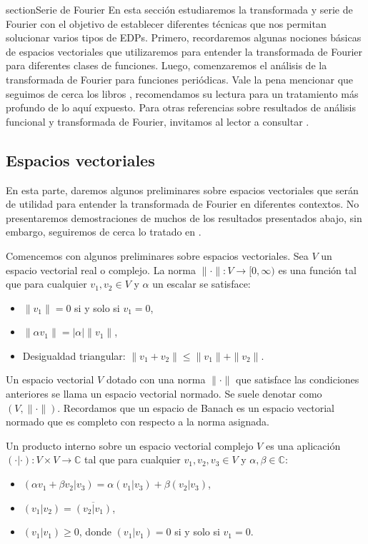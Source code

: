 

section{Serie de Fourier}
En esta sección estudiaremos la transformada y serie de Fourier con el objetivo de establecer diferentes técnicas que nos permitan solucionar varios tipos de EDPs. Primero, recordaremos algunas nociones básicas de espacios vectoriales que utilizaremos para entender la transformada de Fourier para diferentes clases de funciones. Luego, comenzaremos el análisis de la transformada de Fourier para funciones periódicas. Vale la pena mencionar que seguimos de cerca los libros \cite{Fuente3, Fuente4}, recomendamos su lectura para un tratamiento más profundo de lo aquí expuesto. Para otras referencias sobre resultados de análisis funcional y transformada de Fourier, invitamos al lector a consultar \cite{Fuente1, Fuente2, Fuente5, Fuente6}.

\subsection{Espacios vectoriales}
En esta parte, daremos algunos preliminares sobre espacios vectoriales que serán de utilidad para entender la transformada de Fourier en diferentes contextos. No presentaremos demostraciones de muchos de los resultados presentados abajo, sin embargo, seguiremos de cerca lo tratado en \cite{Fuente3, Fuente4}. 

Comencemos con algunos preliminares sobre espacios vectoriales. Sea \( V \) un espacio vectorial real o complejo. La norma \( \| \cdot \|: V \to [0, \infty) \) es una función tal que para cualquier \( v_1, v_2 \in V \) y \( \alpha \) un escalar se satisface: 
\begin{itemize}
    \item \( \|v_1\| = 0 \) si y solo si \( v_1 = 0 \),
    \item \( \|\alpha v_1\| = |\alpha| \|v_1\| \),
    \item Desigualdad triangular: \( \|v_1 + v_2\| \leq \|v_1\| + \|v_2\| \).
\end{itemize}

Un espacio vectorial \( V \) dotado con una norma \( \| \cdot \| \) que satisface las condiciones anteriores se llama un espacio vectorial normado. Se suele denotar como \( (V, \| \cdot \|) \). Recordamos que un espacio de Banach es un espacio vectorial normado que es completo con respecto a la norma asignada.

Un producto interno sobre un espacio vectorial complejo \( V \) es una aplicación \( ( \cdot | \cdot ): V \times V \to \mathbb{C} \) tal que para cualquier \( v_1, v_2, v_3 \in V \) y \( \alpha, \beta \in \mathbb{C} \):
\begin{itemize}
    \item \( ( \alpha v_1 + \beta v_2 | v_3 ) = \alpha ( v_1 | v_3 ) + \beta ( v_2 | v_3 ) \),
    \item \( ( v_1 | v_2 ) = \overline{( v_2 | v_1 )} \),
    \item \( ( v_1 | v_1 ) \geq 0 \), donde \( ( v_1 | v_1 ) = 0 \) si y solo si \( v_1 = 0 \).
\end{itemize}

